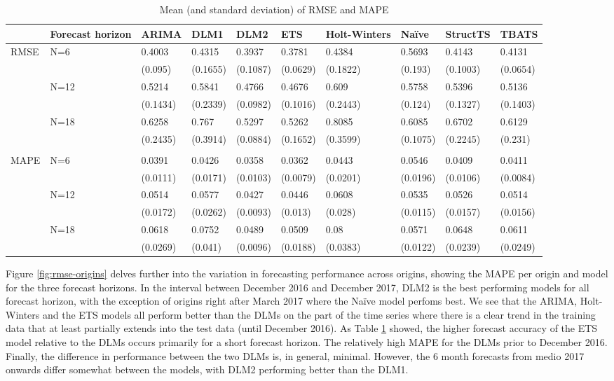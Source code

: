 \documentclass[12pt, a4paper]{article}
\begin{document}
\begin{table}[H]

\caption{\label{tab:error-comparison}Mean (and standard deviation) of RMSE and MAPE}
\centering
\small
\begin{tabular}{p{0.9cm}p{1.0cm}p{1.2cm}p{1.2cm}p{1.2cm}p{1.2cm}p{1.2cm}p{1.2cm}p{1.2cm}p{1.2cm}}
\toprule
 & Forecast horizon & ARIMA & DLM1 & DLM2 & ETS & Holt-Winters & Naïve & StructTS & TBATS\\
\midrule
RMSE & N=6 & 0.4003 & 0.4315 & 0.3937 & 0.3781 & 0.4384 & 0.5693 & 0.4143 & 0.4131\\
 &  & (0.095) & (0.1655) & (0.1087) & (0.0629) & (0.1822) & (0.193) & (0.1003) & (0.0654)\\
 & N=12 & 0.5214 & 0.5841 & 0.4766 & 0.4676 & 0.609 & 0.5758 & 0.5396 & 0.5136\\
 &  & (0.1434) & (0.2339) & (0.0982) & (0.1016) & (0.2443) & (0.124) & (0.1327) & (0.1403)\\
 & N=18 & 0.6258 & 0.767 & 0.5297 & 0.5262 & 0.8085 & 0.6085 & 0.6702 & 0.6129\\
 &  & (0.2435) & (0.3914) & (0.0884) & (0.1652) & (0.3599) & (0.1075) & (0.2245) & (0.231)\\
 &  &  &  &  &  &  &  &  & \\
MAPE & N=6 & 0.0391 & 0.0426 & 0.0358 & 0.0362 & 0.0443 & 0.0546 & 0.0409 & 0.0411\\
 &  & (0.0111) & (0.0171) & (0.0103) & (0.0079) & (0.0201) & (0.0196) & (0.0106) & (0.0084)\\
 & N=12 & 0.0514 & 0.0577 & 0.0427 & 0.0446 & 0.0608 & 0.0535 & 0.0526 & 0.0514\\
 &  & (0.0172) & (0.0262) & (0.0093) & (0.013) & (0.028) & (0.0115) & (0.0157) & (0.0156)\\
 & N=18 & 0.0618 & 0.0752 & 0.0489 & 0.0509 & 0.08 & 0.0571 & 0.0648 & 0.0611\\
 &  & (0.0269) & (0.041) & (0.0096) & (0.0188) & (0.0383) & (0.0122) & (0.0239) & (0.0249)\\
\bottomrule
\end{tabular}
\end{table}


Figure \ref{fig:rmse-origins} delves further into the variation in
forecasting performance across origins, showing the MAPE per origin and
model for the three forecast horizons. In the interval between December
2016 and December 2017, DLM2 is the best performing models for all forecast horizon, with the exception of origins right after March
2017 where the Naïve model perfoms best. We see that the ARIMA,
Holt-Winters and the ETS models all perform better than the DLMs on the
part of the time series where there is a clear trend in the training
data that at least partially extends into the test data (until December
2016). As Table \ref{tab:error-comparison} showed, the higher forecast
accuracy of the ETS model relative to the DLMs occurs primarily for a
short forecast horizon. The relatively high MAPE for the DLMs prior to
December 2016. Finally, the difference in performance between the two
DLMs is, in general, minimal. However, the 6 month forecasts from medio
2017 onwards differ somewhat between the models, with DLM2 performing
better than the DLM1.
\end{document}
